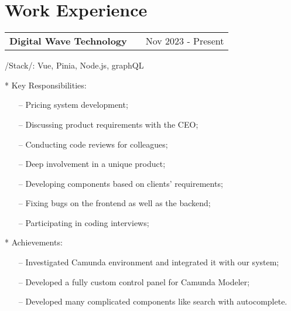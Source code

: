 \documentclass[a4paper,12pt]{article}
\makeatletter
\newenvironment{joblong}[2]
    {
    \begin{tabularx}{\linewidth}{@{}l X r@{}}
    \textbf{#1} & \hfill &  #2 \\[3.75pt]
    \end{tabularx}
    \begin{minipage}[t]{\linewidth}
    \begin{itemize}[nosep,after=\strut, leftmargin=1em, itemsep=3pt,label=--]
    }
    {
    \end{itemize}
    \end{minipage}    
    }
\makeatother
\begin{document}
\section{Work Experience}

\begin{joblong}{Digital Wave Technology}{Nov 2023 - Present}
  \item /Stack/: {Vue, Pinia, Node.js, graphQL}
{\fontsize{13.2pt}{14.6pt}\selectfont
  \item[*] Key Responsibilities:
    \begin{itemize}
      \item[--] Pricing system development;
      \item[--] Discussing product requirements with the CEO;
      \item[--] Conducting code reviews for colleagues;
      \item[--] Deep involvement in a unique product; 
      \item[--] Developing components based on clients' requirements; 
      \item[--] Fixing bugs on the frontend as well as the backend; 
      \item[--] Participating in coding interviews;
    \end{itemize}

  \item[*] Achievements:
    \begin{itemize}
      \item[--] Investigated Camunda environment and integrated it with our system;
      \item[--] Developed a fully custom control panel for Camunda Modeler;
      \item[--] Developed many complicated components like search with autocomplete.
    \end{itemize}
}
\end{joblong}
\end{document}
